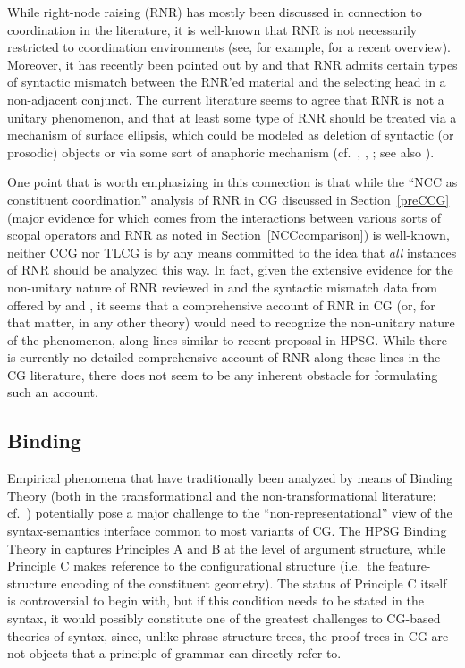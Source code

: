\documentclass[output=paper
                ,modfonts
 	        ,biblatex
                ,babelshorthands
                ,newtxmath
                ,draftmode
                ,colorlinks, citecolor=brown
]{langscibook}
\begin{document}
While right-node raising (RNR) has mostly been discussed in connection to coordination in
the literature, it is well-known that RNR is not necessarily
restricted to coordination environments (see, for example, \citealt{wilder-ellipsis-handbook}
for a recent overview). Moreover, it
has recently been pointed out by \citet{ACS2016a-u} and \citet{SAHM2019a-u} that RNR 
admits certain types of syntactic mismatch between the RNR'ed material
and the selecting head in a non-adjacent conjunct.
The current literature seems to agree that RNR is not a unitary
phenomenon, and that at least some type of RNR should be treated via a
mechanism of surface ellipsis, which could be modeled as deletion of
syntactic (or prosodic) objects or via some sort of anaphoric
mechanism (cf.\ ,
\citealt{Chaves2014a-u}, 
\citealt{SAHM2019a-u}; see also \citealt[footnote 15]{kubota-levine-pseudo}).

One point that is worth emphasizing in this connection is that
while the ``NCC as constituent coordination'' analysis of RNR in CG
discussed in Section~\ref{preCCG} (major evidence for which comes from the
interactions between various sorts of scopal operators and RNR as
noted in Section~\ref{NCCcomparison}) is well-known, neither CCG nor TLCG is by
any means committed to the idea that \emph{all} instances of RNR should be
analyzed this way.
In fact, given the extensive evidence for the non-unitary nature of
RNR reviewed in \citet{Chaves2014a-u} and the syntactic mismatch data from
 offered by \citet{ACS2016a-u} and \citet{SAHM2019a-u}, it seems
that a comprehensive account of RNR in CG (or, for that matter, in any
other theory) would need to recognize the
non-unitary nature of the phenomenon, along lines similar to
 recent proposal in HPSG. While there is currently no
detailed comprehensive account of RNR along these lines in the
CG literature, there does not  seem to be any inherent 
obstacle for formulating such an account.


\subsection{Binding}

Empirical phenomena that have traditionally been analyzed by means of
Binding Theory (both in the transformational and the
non-transformational literature; cf.~)
potentially pose a major challenge to the
``non-representational'' view of the syntax-semantics interface common
to most variants of CG. The HPSG Binding Theory in \textcites{PS92a}[Chapter~6]{ps2}
captures Principles A and B at the level of argument structure, while
Principle C makes reference to the configurational structure (i.e.\
the feature-structure encoding of the constituent geometry). The
status of Principle C itself is controversial to begin with, but if
this condition needs to be stated in the syntax, it would possibly
constitute one of the greatest challenges to CG-based theories of
syntax, since, unlike phrase structure trees, the proof trees in CG
are not objects that a principle of grammar can directly refer to.
\end{document}
